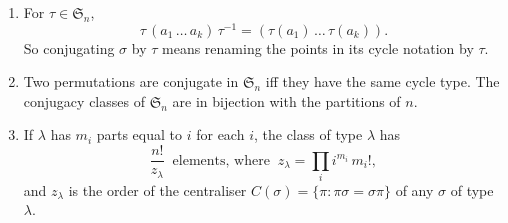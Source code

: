 \begin{proposition}\label{prop:conjSn}
\begin{enumerate}[label=(\alph*)]
\item For $\tau\in\mathfrak S_n$,
\[
\tau\,(a_1\,\dots\,a_k)\,\tau^{-1}=(\tau(a_1)\,\dots\,\tau(a_k)).
\]
So conjugating $\sigma$ by $\tau$ means renaming the points in its cycle notation by $\tau$.
\item Two permutations are conjugate in $\mathfrak S_n$ iff they have the same cycle type. The conjugacy classes of $\mathfrak S_n$ are in bijection with the partitions of $n$.
\item If $\lambda$ has $m_i$ parts equal to $i$ for each $i$, the class of type $\lambda$ has
\[
\frac{n!}{z_\lambda}\ \text{ elements, where }\ z_\lambda=\prod_i i^{m_i}\,m_i!,
\]
and $z_\lambda$ is the order of the centraliser $C(\sigma)=\{\pi:\pi\sigma=\sigma\pi\}$ of any $\sigma$ of type $\lambda$.
\end{enumerate}
\end{proposition}
